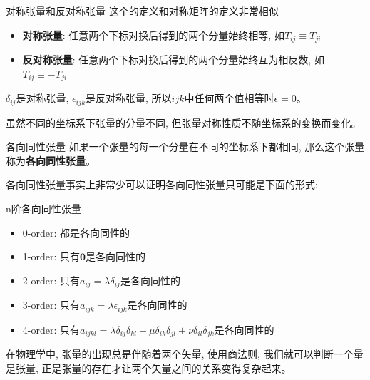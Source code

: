 \begin{define}{对称张量和反对称张量}
    这个的定义和对称矩阵的定义非常相似 
    \begin{itemize}
        \item \textbf{对称张量}: 任意两个下标对换后得到的两个分量始终相等, 如$T_{ij}\equiv T_{ji}$
        \item \textbf{反对称张量}: 任意两个下标对换后得到的两个分量始终互为相反数, 如$T_{ij}\equiv -T_{ji}$
    \end{itemize}
    $\delta_{ij}$是对称张量, $\epsilon_{ijk}$是反对称张量, 所以$ijk$中任何两个值相等时$\epsilon=0$。

    虽然不同的坐标系下张量的分量不同, 但张量对称性质不随坐标系的变换而变化。
\end{define}
\begin{define}{各向同性张量}
    如果一个张量的每一个分量在不同的坐标系下都相同, 那么这个张量称为\textbf{各向同性张量}。
\end{define}
各向同性张量事实上非常少可以证明各向同性张量只可能是下面的形式:
\begin{proposition}{n阶各向同性张量}
    \begin{itemize}
        \item 0-order: 都是各向同性的
        \item 1-order: 只有$\bm{0}$是各向同性的
        \item 2-order: 只有$a_{ij}=\lambda \delta_{ij}$是各向同性的
        \item 3-order: 只有$a_{ijk}=\lambda \epsilon_{ijk}$是各向同性的
        \item 4-order: 只有$a_{ijkl}=\lambda\delta_{ij}\delta_{kl}+\mu\delta_{ik}\delta_{jl}+\nu\delta_{il}\delta_{jk}$是各向同性的
    \end{itemize}
\end{proposition}
在物理学中, 张量的出现总是伴随着两个矢量, 使用商法则, 我们就可以判断一个量是张量, 正是张量的存在才让两个矢量之间的关系变得复杂起来。
